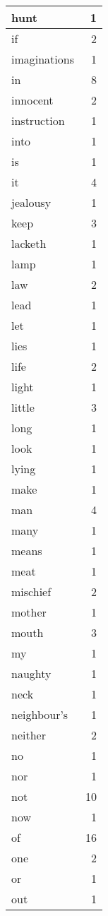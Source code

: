 \begin{center}
\begin{longtable}{l|r}
hunt & 1\\ \hline 
if & 2\\ \hline 
imaginations & 1\\ \hline 
in & 8\\ \hline 
innocent & 2\\ \hline 
instruction & 1\\ \hline 
into & 1\\ \hline 
is & 1\\ \hline 
it & 4\\ \hline 
jealousy & 1\\ \hline 
keep & 3\\ \hline 
lacketh & 1\\ \hline 
lamp & 1\\ \hline 
law & 2\\ \hline 
lead & 1\\ \hline 
let & 1\\ \hline 
lies & 1\\ \hline 
life & 2\\ \hline 
light & 1\\ \hline 
little & 3\\ \hline 
long & 1\\ \hline 
look & 1\\ \hline 
lying & 1\\ \hline 
make & 1\\ \hline 
man & 4\\ \hline 
many & 1\\ \hline 
means & 1\\ \hline 
meat & 1\\ \hline 
mischief & 2\\ \hline 
mother & 1\\ \hline 
mouth & 3\\ \hline 
my & 1\\ \hline 
naughty & 1\\ \hline 
neck & 1\\ \hline 
neighbour's & 1\\ \hline 
neither & 2\\ \hline 
no & 1\\ \hline 
nor & 1\\ \hline 
not & 10\\ \hline 
now & 1\\ \hline 
of & 16\\ \hline 
one & 2\\ \hline 
or & 1\\ \hline 
out & 1\\ \hline 

\end{longtable}
\end{center}
